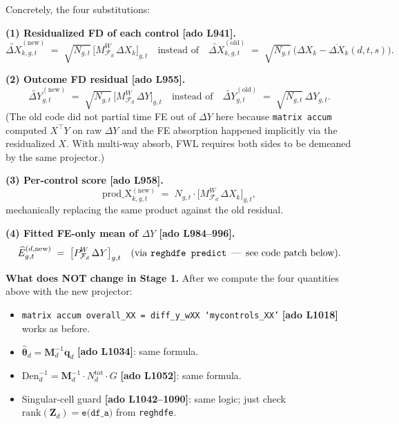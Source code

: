 \documentclass[11pt]{article}
\newcommand{\code}[1]{\texttt{\small #1}}
\newcommand{\Adoref}[1]{\textcolor{accent}{\footnotesize\textbf{[ado L#1]}}}
\newcommand{\1}{\mathbb{1}}
\newcommand{\thetad}{\widehat{\bm{\theta}}_d}
\newcommand{\Ngt}{N_{g,t}}
\newcommand{\Pdca}{P^{\!W}_{\mathcal{F}_d}}
\newcommand{\Mdca}{M^{\!W}_{\mathcal{F}_d}}
\begin{document}
\medskip\noindent
Concretely, the four substitutions:

\medskip
\noindent\textbf{(1) Residualized FD of each control \Adoref{941}.}
\begin{equation}
\widetilde{\Delta X}^{(\mathrm{new})}_{k,g,t} \;=\; \sqrt{\Ngt}\,\bigl[\Mdca\,\Delta X_k\bigr]_{g,t}
\quad\text{instead of}\quad
\widetilde{\Delta X}^{(\mathrm{old})}_{k,g,t} \;=\; \sqrt{\Ngt}\,\bigl(\Delta X_k - \overline{\Delta X}_k(d,t,s)\bigr).
\label{eq:resXnew}
\end{equation}

\medskip
\noindent\textbf{(2) Outcome FD residual \Adoref{955}.}
\begin{equation}
\widetilde{\Delta Y}^{(\mathrm{new})}_{g,t} \;=\; \sqrt{\Ngt}\,\bigl[\Mdca\,\Delta Y\bigr]_{g,t}
\quad\text{instead of}\quad
\widetilde{\Delta Y}^{(\mathrm{old})}_{g,t} \;=\; \sqrt{\Ngt}\,\Delta Y_{g,t}.
\label{eq:resYnew}
\end{equation}
(The old code did not partial time FE out of $\Delta Y$ here because
\texttt{matrix accum} computed $X^{\top}Y$ on raw $\Delta Y$ and the FE
absorption happened implicitly via the residualized $X$. With multi-way
absorb, FWL requires both sides to be demeaned by the same projector.)

\medskip
\noindent\textbf{(3) Per-control score \Adoref{958}.}
\begin{equation}
\mathrm{prod\_X}_{k,g,t}^{(\mathrm{new})} \;=\; \Ngt\cdot \bigl[\Mdca\,\Delta X_k\bigr]_{g,t},
\label{eq:prodXnew}
\end{equation}
mechanically replacing the same product against the old residual.

\medskip
\noindent\textbf{(4) Fitted FE-only mean of $\Delta Y$ \Adoref{984--996}.}
\begin{equation}
\widehat{E}^{(d,\mathrm{new})}_{g,t} \;=\; \bigl[\Pdca\,\Delta Y\bigr]_{g,t}
\quad\text{(via \texttt{reghdfe predict} \,---\, see code patch below).}
\label{eq:Ehatnew}
\end{equation}

\medskip\noindent
\textbf{What does NOT change in Stage 1.} After we compute the four
quantities above with the new projector:
\begin{itemize}[leftmargin=*, itemsep=2pt]
  \item \code{matrix accum overall\_XX = diff\_y\_wXX `mycontrols\_XX'}
        \Adoref{1018} works as before.
  \item $\thetad = \bm{M}_d^{-1}\bm{q}_d$ \Adoref{1034}: same formula.
  \item $\mathrm{Den}_d^{-1} = \bm{M}_d^{-1}\cdot N_d^{\mathrm{tot}}\cdot G$
        \Adoref{1052}: same formula.
  \item Singular-cell guard \Adoref{1042--1090}: same logic; just check
        $\mathrm{rank}(\bm{Z}_d) = \texttt{e(df\_a)}$ from \texttt{reghdfe}.
\end{itemize}
\end{document}
